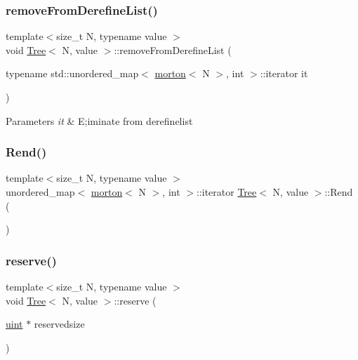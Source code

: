 \subsubsection{\texorpdfstring{remove\+From\+Derefine\+List()}{removeFromDerefineList()}}
{\footnotesize\ttfamily template$<$size\+\_\+t N, typename value $>$ \\
void \mbox{\hyperlink{classTree}{Tree}}$<$ N, value $>$\+::remove\+From\+Derefine\+List (\begin{DoxyParamCaption}\item[{typename std\+::unordered\+\_\+map$<$ \mbox{\hyperlink{definitions_8h_af8682350bd8bb38ee9023f7a0a310add}{morton}}$<$ N $>$, int $>$\+::iterator}]{it }\end{DoxyParamCaption})}


\begin{DoxyParams}{Parameters}
{\em it} & E;iminate from derefinelist \\
\hline
\end{DoxyParams}
\mbox{\label{classTree_aa3414a027171fb07f8f4b9acb0699d9a}} 
\subsubsection{\texorpdfstring{Rend()}{Rend()}}
{\footnotesize\ttfamily template$<$size\+\_\+t N, typename value $>$ \\
unordered\+\_\+map$<$ \mbox{\hyperlink{definitions_8h_af8682350bd8bb38ee9023f7a0a310add}{morton}}$<$ N $>$, int $>$\+::iterator \mbox{\hyperlink{classTree}{Tree}}$<$ N, value $>$\+::Rend (\begin{DoxyParamCaption}{ }\end{DoxyParamCaption})}

\mbox{\label{classTree_aca5c23bba3aa776b573e4f81d3ada031}} 
\subsubsection{\texorpdfstring{reserve()}{reserve()}}
{\footnotesize\ttfamily template$<$size\+\_\+t N, typename value $>$ \\
void \mbox{\hyperlink{classTree}{Tree}}$<$ N, value $>$\+::reserve (\begin{DoxyParamCaption}\item[{\mbox{\hyperlink{definitions_8h_a69aa29b598b851b0640aa225a9e5d61d}{uint}} $\ast$}]{reservedsize }\end{DoxyParamCaption})}

